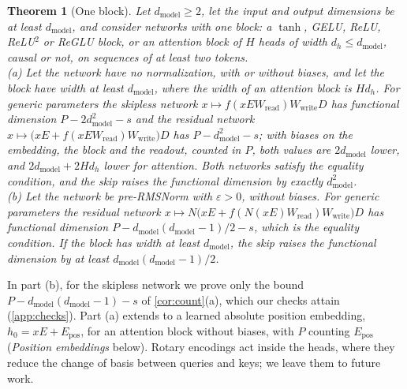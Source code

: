 \documentclass[10pt]{article}
\newtheorem{theorem}{Theorem}
\theoremstyle{definition}
\theoremstyle{remark}
\newcommand{\Wread}{W_{\mathrm{read}}}
\newcommand{\Wwrite}{W_{\mathrm{write}}}
\newcommand{\dm}{d_{\mathrm{model}}}
\begin{document}
\begin{theorem}[One block]\label{thm:onelayer}
Let $\dm \ge 2$, let the input and output dimensions be at least $\dm$, and consider networks with one block: a $\tanh$, GELU, ReLU, ReLU$^2$ or ReGLU block, or an attention block of $H$ heads of width $d_h \le \dm$, causal or not, on sequences of at least two tokens.\\
\textup{(a)} Let the network have no normalization, with or without biases, and let the block have width at least $\dm$, where the width of an attention block is $Hd_h$. For generic parameters the skipless network $x \mapsto f(xE\Wread)\Wwrite D$ has functional dimension $P - 2\dm^2 - s$ and the residual network $x \mapsto \big(xE + f(xE\Wread)\Wwrite\big)D$ has $P - \dm^2 - s$; with biases on the embedding, the block and the readout, counted in $P$, both values are $2\dm$ lower, and $2\dm + 2Hd_h$ lower for attention. Both networks satisfy the equality condition, and the skip raises the functional dimension by exactly $\dm^2$.\\
\textup{(b)} Let the network be pre-RMSNorm with $\varepsilon > 0$, without biases. For generic parameters the residual network $x \mapsto N\big(xE + f(N(xE)\Wread)\Wwrite\big)D$ has functional dimension $P - \dm(\dm-1)/2 - s$, which is the equality condition. If the block has width at least $\dm$, the skip raises the functional dimension by at least $\dm(\dm-1)/2$.
\end{theorem}

In part (b), for the skipless network we prove only the bound $P - \dm(\dm-1) - s$ of \cref{cor:count}(a), which our checks attain (\cref{app:checks}). Part (a) extends to a learned absolute position embedding, $h_0 = xE + E_{\mathrm{pos}}$, for an attention block without biases, with $P$ counting $E_{\mathrm{pos}}$ (\emph{Position embeddings} below). Rotary encodings act inside the heads, where they reduce the change of basis between queries and keys; we leave them to future work.
\end{document}
